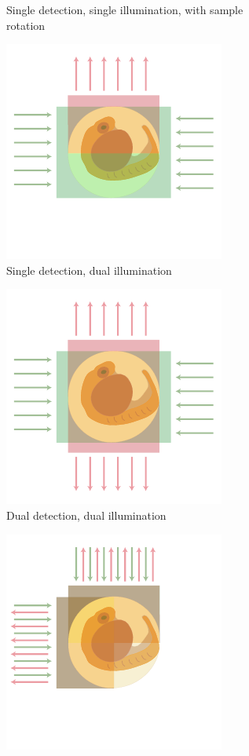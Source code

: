 \begin{figure}
\begin{subfigure}[t]{0.4\textwidth}
        \caption{Single detection, single illumination, with sample rotation~\cite{huisken_optical_2004}}
        \label{fig:depth/spin_spim}
    \end{subfigure}
    \begin{subfigure}[t]{0.4\textwidth}
        \centering
        \includegraphics{depth/dual_illumination}
        \caption{Single detection, dual illumination~}
        \label{fig:depth/dual_illumination}
    \end{subfigure}\hspace{0.07\textwidth}
    \begin{subfigure}[t]{0.4\textwidth}
        \centering
        \includegraphics{depth/multiview}
        \caption{Dual detection, dual illumination~\cite{krzicMultiviewLightsheetMicroscope2012}}
        \label{fig:depth/multiview}
    \end{subfigure}
    \begin{subfigure}[t]{0.4\textwidth}
        \centering
        \includegraphics{depth/di_spim}

\end{subfigure}
\end{figure}
